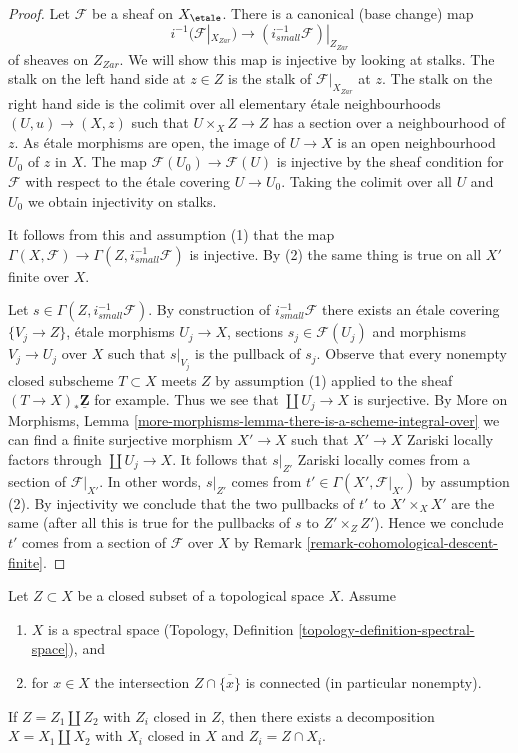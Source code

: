 \begin{proof}
Let $\mathcal{F}$ be a sheaf on $X_\etale$. There is a canonical
(base change) map
$$
i^{-1}(\mathcal{F}|_{X_{Zar}})
\longrightarrow
(i_{small}^{-1}\mathcal{F})|_{Z_{Zar}}
$$
of sheaves on $Z_{Zar}$. We will show this map is injective by looking
at stalks. The stalk on the left hand side at $z \in Z$
is the stalk of $\mathcal{F}|_{X_{Zar}}$ at $z$. The stalk on the right
hand side is the colimit over all elementary \'etale neighbourhoods
$(U, u) \to (X, z)$ such that $U \times_X Z \to Z$ has a section over
a neighbourhood of $z$. As \'etale morphisms are open, the image of
$U \to X$ is an open neighbourhood $U_0$ of $z$ in $X$. The map
$\mathcal{F}(U_0) \to \mathcal{F}(U)$ is injective by the sheaf
condition for $\mathcal{F}$ with respect to the \'etale covering $U \to U_0$.
Taking the colimit over all $U$ and $U_0$ we obtain injectivity on stalks.

\medskip\noindent
It follows from this and assumption (1) that the map
$\Gamma(X, \mathcal{F}) \to \Gamma(Z, i^{-1}_{small}\mathcal{F})$
is injective. By (2) the same thing is true on all $X'$ finite over $X$.

\medskip\noindent
Let $s \in \Gamma(Z, i^{-1}_{small}\mathcal{F})$. By construction of
$i^{-1}_{small}\mathcal{F}$ there exists an \'etale covering
$\{V_j \to Z\}$, \'etale morphisms $U_j \to X$, sections
$s_j \in \mathcal{F}(U_j)$ and morphisms $V_j \to U_j$ over $X$
such that $s|_{V_j}$ is the pullback of $s_j$.
Observe that every nonempty closed subscheme $T \subset X$ meets $Z$
by assumption (1) applied to the sheaf $(T \to X)_*\underline{\mathbf{Z}}$
for example. Thus we see that $\coprod U_j \to X$ is surjective.
By More on Morphisms, Lemma
\ref{more-morphisms-lemma-there-is-a-scheme-integral-over}
we can find a finite surjective morphism $X' \to X$
such that $X' \to X$ Zariski locally factors through $\coprod U_j \to X$.
It follows that $s|_{Z'}$ Zariski locally comes
from a section of $\mathcal{F}|_{X'}$. In other words,
$s|_{Z'}$ comes from $t' \in \Gamma(X', \mathcal{F}|_{X'})$
by assumption (2).
By injectivity we conclude that the two pullbacks of $t'$ to
$X' \times_X X'$ are the same (after all this is true for
the pullbacks of $s$ to $Z' \times_Z Z'$). Hence we conclude
$t'$ comes from a section of $\mathcal{F}$ over $X$ by
Remark \ref{remark-cohomological-descent-finite}.
\end{proof}

\begin{lemma}
\label{lemma-connected-topological}
Let $Z \subset X$ be a closed subset of a topological space $X$.
Assume
\begin{enumerate}
\item $X$ is a spectral space
(Topology, Definition \ref{topology-definition-spectral-space}), and
\item for $x \in X$ the intersection $Z \cap \overline{\{x\}}$
is connected (in particular nonempty).
\end{enumerate}
If $Z = Z_1 \amalg Z_2$ with $Z_i$ closed in $Z$,
then there exists a decomposition $X = X_1 \amalg X_2$ with
$X_i$ closed in $X$ and $Z_i = Z \cap X_i$.
\end{lemma}

